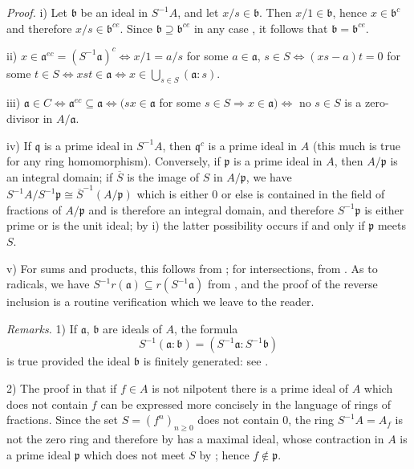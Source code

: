 \noindent\textit{Proof.} i) Let $\mathfrak b$ be an ideal in $S^{-1}A$, and let $x/s\in\mathfrak b$. Then $x/1\in\mathfrak b$, hence $x\in\mathfrak b^c$ and therefore $x/s\in\mathfrak b^{ce}$. Since $\mathfrak b\supseteq\mathfrak b^{ce}$ in any case , it follows that $\mathfrak b=\mathfrak b^{ce}$.

ii) $x\in\mathfrak a^{ec}=(S^{-1}\mathfrak a)^c\Longleftrightarrow x/1=a/s$ for some $a\in\mathfrak a$, $s\in S\Longleftrightarrow(xs-a)t=0$ for some $t\in S\Longleftrightarrow xst\in\mathfrak a\Longleftrightarrow x\in\bigcup_{s\in S}(\mathfrak a:s)$.

iii) $\mathfrak a\in C\Longleftrightarrow\mathfrak a^{ec}\subseteq\mathfrak a\Longleftrightarrow(sx\in\mathfrak a$ for some $s\in S\Rightarrow x\in\mathfrak a)\Longleftrightarrow$ no $s\in S$ is a zero-divisor in $A/\mathfrak a$.

iv) If $\mathfrak q$ is a prime ideal in $S^{-1}A$, then $\mathfrak q^c$ is a prime ideal in $A$ (this much is true for any ring homomorphism). Conversely, if $\mathfrak p$ is a prime ideal in $A$, then $A/\mathfrak p$ is an integral domain; if $\overline S$ is the image of $S$ in $A/\mathfrak p$, we have $S^{-1}A/S^{-1}\mathfrak p\cong\overline S^{-1}(A/\mathfrak p)$ which is either $0$ or else is contained in the field of fractions of $A/\mathfrak p$ and is therefore an integral domain, and therefore $S^{-1}\mathfrak p$ is either prime or is the unit ideal; by i) the latter possibility occurs if and only if $\mathfrak p$ meets $S$.

v) For sums and products, this follows from ; for intersections, from . As to radicals, we have $S^{-1}r(\mathfrak a)\subseteq r(S^{-1}\mathfrak a)$ from , and the proof of the reverse inclusion is a routine verification which we leave to the reader. \proofbox

\noindent\textit{Remarks.} 1) If $\mathfrak a$, $\mathfrak b$ are ideals of $A$, the formula
\[
 S^{-1}(\mathfrak a:\mathfrak b)=(S^{-1}\mathfrak a:S^{-1}\mathfrak b)
\]
is true provided the ideal $\mathfrak b$ is finitely generated: see .

2) The proof in  that if $f\in A$ is not nilpotent there is a prime ideal of $A$ which does not contain $f$ can be expressed more concisely in the language of rings of fractions. Since the set $S=(f^n)_{n\geq0}$ does not contain $0$, the ring $S^{-1}A=A_f$ is not the zero ring and therefore by  has a maximal ideal, whose contraction in $A$ is a prime ideal $\mathfrak p$ which does not meet $S$ by ; hence $f\notin\mathfrak p$.

